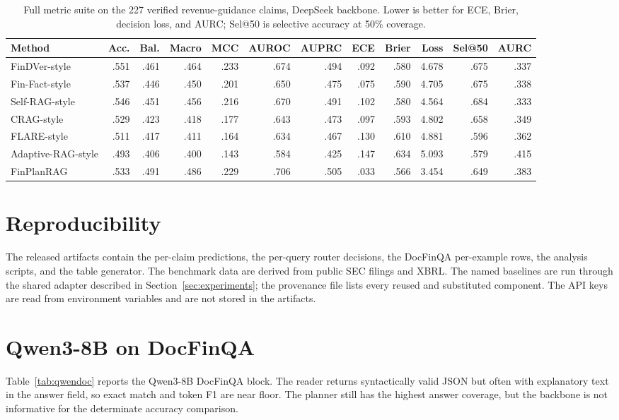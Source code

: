 \documentclass[11pt]{article}
\newcommand{\method}{FinPlanRAG}
\begin{document}
\begin{table}[t]
\centering
\scriptsize
\setlength{\tabcolsep}{4pt}
\caption{Full metric suite on the 227 verified revenue-guidance claims, DeepSeek backbone. Lower is better for ECE, Brier, decision loss, and AURC; Sel@50 is selective accuracy at 50\% coverage.}
\label{tab:fullmetrics}
\begin{tabular}{lrrrrrrrrrrr}
\toprule
Method & Acc. & Bal. & Macro & MCC & AUROC & AUPRC & ECE & Brier & Loss & Sel@50 & AURC \\
\midrule
FinDVer-style & .551 & .461 & .464 & .233 & .674 & .494 & .092 & .580 & 4.678 & .675 & .337 \\
Fin-Fact-style & .537 & .446 & .450 & .201 & .650 & .475 & .075 & .590 & 4.705 & .675 & .338 \\
Self-RAG-style & .546 & .451 & .456 & .216 & .670 & .491 & .102 & .580 & 4.564 & .684 & .333 \\
CRAG-style & .529 & .423 & .418 & .177 & .643 & .473 & .097 & .593 & 4.802 & .658 & .349 \\
FLARE-style & .511 & .417 & .411 & .164 & .634 & .467 & .130 & .610 & 4.881 & .596 & .362 \\
Adaptive-RAG-style & .493 & .406 & .400 & .143 & .584 & .425 & .147 & .634 & 5.093 & .579 & .415 \\
\method & .533 & .491 & .486 & .229 & .706 & .505 & .033 & .566 & 3.454 & .649 & .383 \\
\bottomrule
\end{tabular}
\end{table}

\section{Reproducibility}
The released artifacts contain the per-claim predictions, the per-query router decisions, the DocFinQA per-example rows, the analysis scripts, and the table generator. The benchmark data are derived from public SEC filings and XBRL. The named baselines are run through the shared adapter described in Section~\ref{sec:experiments}; the provenance file lists every reused and substituted component. The API keys are read from environment variables and are not stored in the artifacts.


\section{Qwen3-8B on DocFinQA}
\label{app:qwen}
Table~\ref{tab:qwendoc} reports the Qwen3-8B DocFinQA block. The reader returns syntactically valid JSON but often with explanatory text in the answer field, so exact match and token F1 are near floor. The planner still has the highest answer coverage, but the backbone is not informative for the determinate accuracy comparison.
\end{document}
